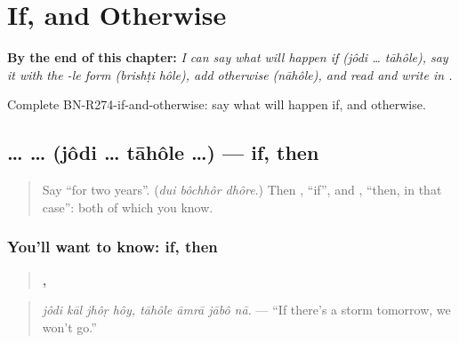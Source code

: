 
\chapter{If, and Otherwise}
\label{ch:bn-if-and-otherwise}

\begin{chapteropening}
\textbf{By the end of this chapter:} \emph{I can say what will happen if (jôdi … tāhôle), say it with the -le form (brishṭi hôle), add otherwise (nāhôle), and read and write  in .}

Complete BN-R274-if-and-otherwise: say what will happen if, and otherwise.
\end{chapteropening}

\section[\texorpdfstring{\bn{যদি} … \bn{তাহলে} … (jôdi … tāhôle …)}{যদি … তাহলে … (jôdi … tāhôle …)}]{ …  … (jôdi … tāhôle …) — if, then}

\label{lesson:BN-C274-jodi-tahole}



\begin{quote}
Say \textquotedblleft{}for two years\textquotedblright{}. (\emph{dui bôchhôr dhôre}.) Then \textbf{}, \textquotedblleft{}if\textquotedblright{}, and \textbf{}, \textquotedblleft{}then, in that case\textquotedblright{}: both of which you know.
\end{quote}

\subsection*{You'll want to know: if, then}
\begin{quote}
\textbf{   ,    }
\end{quote}

\begin{quote}
\emph{jôdi kāl jhôṛ hôy, tāhôle āmrā jābô nā.} — \textquotedblleft{}If there's a storm tomorrow, we won't go.\textquotedblright{}
\end{quote}


